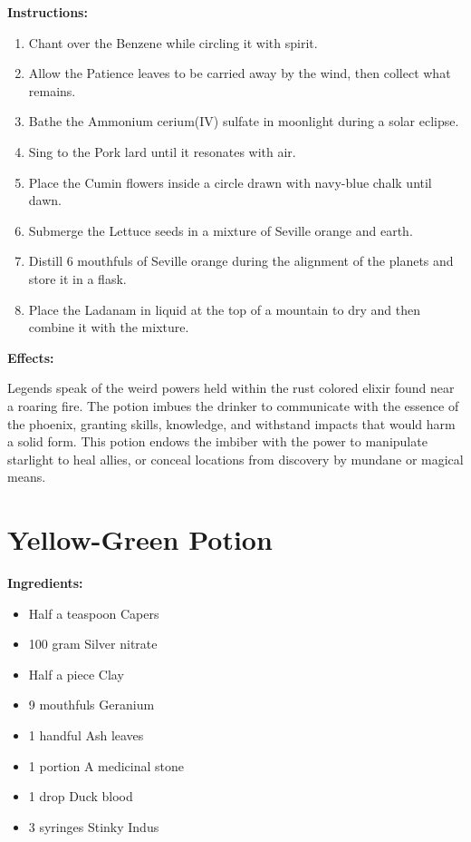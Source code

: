 \documentclass{article}
\begin{document}
\textbf{Instructions:}

\begin{enumerate}
  \item Chant over the Benzene while circling it with spirit.
  \item Allow the Patience leaves to be carried away by the wind, then collect what remains.
  \item Bathe the Ammonium cerium(IV) sulfate in moonlight during a solar eclipse.
  \item Sing to the Pork lard until it resonates with air.
  \item Place the Cumin flowers inside a circle drawn with navy-blue chalk until dawn.
  \item Submerge the Lettuce seeds in a mixture of Seville orange and earth.
  \item Distill 6 mouthfuls of Seville orange during the alignment of the planets and store it in a flask.
  \item Place the Ladanam in liquid at the top of a mountain to dry and then combine it with the mixture.
\end{enumerate}

\textbf{Effects:}

Legends speak of the weird powers held within the rust colored elixir found near a roaring fire. The potion imbues the drinker to communicate with the essence of the phoenix, granting skills, knowledge, and withstand impacts that would harm a solid form. This potion endows the imbiber with the power to manipulate starlight to heal allies, or conceal locations from discovery by mundane or magical means.

\newpage
\section*{Yellow-Green Potion}

\textbf{Ingredients:}

\begin{itemize}
  \item Half a teaspoon Capers
  \item 100 gram Silver nitrate
  \item Half a piece Clay
  \item 9 mouthfuls Geranium
  \item 1 handful Ash leaves
  \item 1 portion A medicinal stone
  \item 1 drop Duck blood
  \item 3 syringes Stinky Indus
\end{itemize}
\end{document}
